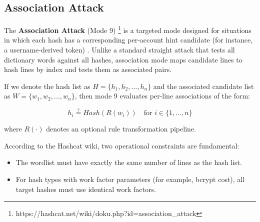 \subsection{Association Attack}

The \textbf{Association Attack} (Mode 9) \footnote{https://hashcat.net/wiki/doku.php?id=association\_attack} is a targeted mode designed for situations in which each hash has a corresponding per-account hint candidate (for instance, a username-derived token) \cite{hashcat_wiki}. Unlike a standard straight attack that tests all dictionary words against all hashes, association mode maps candidate lines to hash lines by index and tests them as associated pairs.

If we denote the hash list as $H=\{h_1,h_2,\dots,h_n\}$ and the associated candidate list as $W=\{w_1,w_2,\dots,w_n\}$, then mode 9 evaluates per-line associations of the form:

\begin{equation}
    h_i \stackrel{?}{=} Hash(R(w_i))\quad\text{for }i\in\{1,\dots,n\}
\end{equation}

where $R(\cdot)$ denotes an optional rule transformation pipeline.

According to the Hashcat wiki, two operational constraints are fundamental:

\begin{itemize}
    \item The wordlist must have exactly the same number of lines as the hash list.
    \item For hash types with work factor parameters (for example, bcrypt cost), all target hashes must use identical work factors.
\end{itemize}

